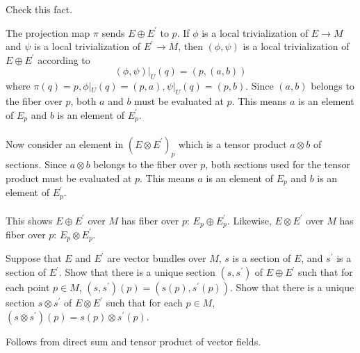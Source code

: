 \documentclass[10pt]{article}
\begin{document}
\begin{example}
	Check this fact.
\end{example}
\sol The projection map $\pi$ sends $E\oplus E^\prime$ to $p$. If $\phi$ is a local trivialization of $E\to M$ and $\psi$ is a local trivialization of $E^\prime\to M$, then $(\phi,\psi)$ is a local trivialization of $E\oplus E^\prime$ according to
$$
(\phi,\psi)|_U(q) = (p,(a,b))
$$
where $\pi(q)=p,\phi|_U(q)=(p,a),\psi|_U(q)=(p,b)$. Since $(a,b)$ belongs to the fiber over $p$, both $a$ and $b$ must be evaluated at $p$. This means $a$ is an element of $E_p$ and $b$ is an element of $E_p^\prime$.\\\\
Now consider an element in $(E\otimes E^\prime)_p$ which is a tensor product $a \otimes b$ of sections. Since $a \otimes b$ belongs to the fiber over $p$, both sections used for the tensor product must be evaluated at $p$. This means $a$ is an element of $E_p$ and $b$ is an element of $E_p^\prime$.\\\\
This shows $E\oplus E^\prime$ over $M$ has fiber over $p$: $E_p\oplus E_p^\prime$. Likewise, $E\otimes E^\prime$ over $M$ has fiber over $p$: $E_p\otimes E_p^\prime$.


\begin{example}\label{b2e71}
	Suppose that $E$ and $E^\prime$ are vector bundles over $M$, $s$ is a section of $E$, and $s^\prime$ is a section of $E^\prime$. Show that there is a unique section $(s,s^\prime)$ of $E \oplus E^\prime$ such that for each point $p \in M$, $(s,s^\prime)(p) = (s(p),s^\prime(p))$. Show that there is a unique section $s \otimes s^\prime$ of $E \otimes E^\prime$ such that for each $p \in M$, $(s \otimes s^\prime)(p) = s(p) \otimes s^\prime(p)$.
\end{example}
\sol Follows from direct sum and tensor product of vector fields.
\end{document}
